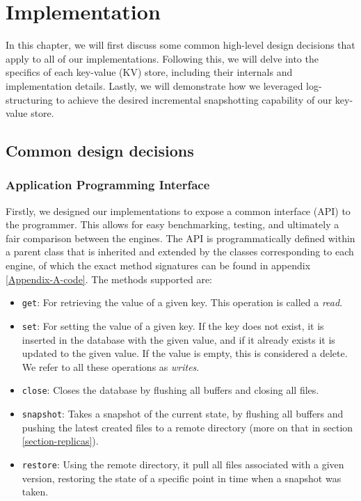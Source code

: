 
\chapter{Implementation}

\label{Chapter3-implementation}

In this chapter, we will first discuss some common high-level design decisions that apply to all of our implementations.
Following this, we will delve into the specifics of each key-value (KV) store, including their internals and implementation details.
Lastly, we will demonstrate how we leveraged log-structuring to achieve the desired incremental snapshotting capability of our key-value store.

\section{Common design decisions}

\subsection{Application Programming Interface}

Firstly, we designed our implementations to expose a common interface (API) to the programmer.
This allows for easy benchmarking, testing, and ultimately a fair comparison between the engines.
The API is programmatically defined within a parent class that is inherited and extended by the classes corresponding to each engine, of which the exact method signatures can be found in appendix \ref{Appendix-A-code}.
The methods supported are:

\begin{itemize}
    \item \verb"get": For retrieving the value of a given key. This operation is called a \textit{read}.
    \item \verb"set": For setting the value of a given key. If the key does not exist, it is inserted in the database with the given value, and if it already exists it is updated to the given value. If the value is empty, this is considered a delete. We refer to all these operations as \textit{writes}.
    \item \verb"close": Closes the database by flushing all buffers and closing all files.
    \item \verb"snapshot": Takes a snapshot of the current state, by flushing all buffers and pushing the latest created files to a remote directory (more on that in section \ref{section-replicas}).
    \item \verb"restore": Using the remote directory, it pull all files  associated with a given version, restoring the state of a specific point in time when a snapshot was taken.
\end{itemize}

